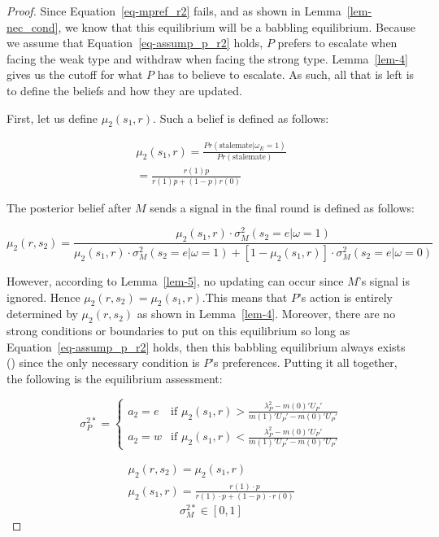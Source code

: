 \documentclass[
  12pt,
]{article}
\theoremstyle{plain}
\theoremstyle{plain}
\theoremstyle{remark}
\begin{document}
\begin{proof}
Since Equation~\ref{eq-mpref_r2} fails, and as shown in
Lemma~\ref{lem-nec_cond}, we know that this equilibrium will be a
babbling equilibrium. Because we assume that
Equation~\ref{eq-assump_p_r2} holds, \(P\) prefers to escalate when
facing the weak type and withdraw when facing the strong type.
Lemma~\ref{lem-4} gives us the cutoff for what \(P\) has to believe to
escalate. As such, all that is left is to define the beliefs and how
they are updated.

First, let us define \(\mu_2(s_1, r)\). Such a belief is defined as
follows:

\[
\begin{aligned}
\mu_2(s_1, r) = \frac{Pr(\text{stalemate}|\omega_E=1)}{Pr(\text{stalemate})}\\
= \frac{r(1) p}{r(1)p + (1 - p) r(0)} 
\end{aligned}
\]

The posterior belief after \(M\) sends a signal in the final round is
defined as follows:

\[
\mu_2(r, s_2) = \frac{\mu_2(s_1, r) \cdot \sigma_M^2(s_2 = e|\omega=1)}{\mu_2(s_1, r) \cdot \sigma_M^2(s_2 = e|\omega=1) + [1 - \mu_2(s_1, r)] \cdot \sigma_M^2(s_2 = e|\omega=0)}
\]

However, according to Lemma~\ref{lem-5}, no updating can occur since
\(M\)'s signal is ignored. Hence \(\mu_2(r, s_2) = \mu_2(s_1, r)\).This
means that \(P\)'s action is entirely determined by \(\mu_2(r, s_2)\) as
shown in Lemma~\ref{lem-4}. Moreover, there are no strong conditions or
boundaries to put on this equilibrium so long as
Equation~\ref{eq-assump_p_r2} holds, then this babbling equilibrium
always exists () since the only necessary condition is \(P\)'s preferences.
Putting it all together, the following is the equilibrium assessment:

\[
\sigma_P^{2*} = 
\begin{cases} 
a_2 = e & \text{if } \mu_2(s_1, r) > \frac{\lambda^2_P - m(0)' U_P '}{m(1)' U_P' - m(0)' U_P'}\\
a_2 = w & \text{if } \mu_2(s_1, r) < \frac{\lambda^2_P - m(0)' U_P '}{m(1)' U_P' - m(0)' U_P'}
\end{cases}
\]

\[
\begin{aligned}
\mu_2(r, s_2) =  \mu_2(s_1, r)\\
\mu_2(s_1, r) =  \frac{r(1) \cdot p}{r(1) \cdot p + (1 - p) \cdot r(0)}
\end{aligned}
\] \[
\sigma_M^{2*} \in [0, 1]
\]
\end{proof}
\end{document}
